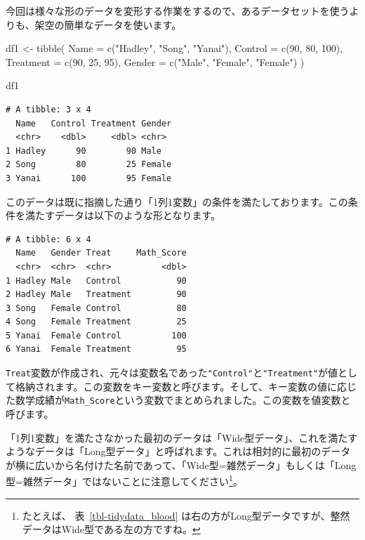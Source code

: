 \documentclass[
  a4paper,
  pandoc,
  ja=standard,
  jafont=haranoaji]{bxjsbook}
\newenvironment{Shaded}{\begin{snugshade}}{\end{snugshade}}
\newcommand{\AttributeTok}[1]{\textcolor[rgb]{0.00,0.48,0.65}{#1}}
\newcommand{\DecValTok}[1]{\textcolor[rgb]{0.68,0.00,0.00}{#1}}
\newcommand{\FunctionTok}[1]{\textcolor[rgb]{0.28,0.35,0.67}{#1}}
\newcommand{\NormalTok}[1]{\textcolor[rgb]{0.00,0.48,0.65}{#1}}
\newcommand{\OtherTok}[1]{\textcolor[rgb]{0.00,0.48,0.65}{#1}}
\newcommand{\StringTok}[1]{\textcolor[rgb]{0.13,0.47,0.30}{#1}}
\begin{document}
今回は様々な形のデータを変形する作業をするので、あるデータセットを使うよりも、架空の簡単なデータを使います。

\begin{Shaded}
\begin{Highlighting}[numbers=left,,]
\NormalTok{df1 }\OtherTok{\textless{}{-}} \FunctionTok{tibble}\NormalTok{(}
  \AttributeTok{Name      =} \FunctionTok{c}\NormalTok{(}\StringTok{"Hadley"}\NormalTok{, }\StringTok{"Song"}\NormalTok{, }\StringTok{"Yanai"}\NormalTok{),}
  \AttributeTok{Control   =} \FunctionTok{c}\NormalTok{(}\DecValTok{90}\NormalTok{, }\DecValTok{80}\NormalTok{, }\DecValTok{100}\NormalTok{),}
  \AttributeTok{Treatment =} \FunctionTok{c}\NormalTok{(}\DecValTok{90}\NormalTok{, }\DecValTok{25}\NormalTok{, }\DecValTok{95}\NormalTok{),}
  \AttributeTok{Gender    =} \FunctionTok{c}\NormalTok{(}\StringTok{"Male"}\NormalTok{, }\StringTok{"Female"}\NormalTok{, }\StringTok{"Female"}\NormalTok{)}
\NormalTok{)}

\NormalTok{df1}
\end{Highlighting}
\end{Shaded}

\begin{verbatim}
# A tibble: 3 x 4
  Name   Control Treatment Gender
  <chr>    <dbl>     <dbl> <chr> 
1 Hadley      90        90 Male  
2 Song        80        25 Female
3 Yanai      100        95 Female
\end{verbatim}

このデータは既に指摘した通り「1列1変数」の条件を満たしております。この条件を満たすデータは以下のような形となります。

\begin{verbatim}
# A tibble: 6 x 4
  Name   Gender Treat     Math_Score
  <chr>  <chr>  <chr>          <dbl>
1 Hadley Male   Control           90
2 Hadley Male   Treatment         90
3 Song   Female Control           80
4 Song   Female Treatment         25
5 Yanai  Female Control          100
6 Yanai  Female Treatment         95
\end{verbatim}

\texttt{Treat}変数が作成され、元々は変数名であった\texttt{"Control"}と\texttt{"Treatment"}が値として格納されます。この変数をキー変数と呼びます。そして、キー変数の値に応じた数学成績が\texttt{Math\_Score}という変数でまとめられました。この変数を値変数と呼びます。

「1列1変数」を満たさなかった最初のデータは「Wide型データ」、これを満たすようなデータは「Long型データ」と呼ばれます。これは相対的に最初のデータが横に広いから名付けた名前であって、「Wide型=雑然データ」もしくは「Long型=雑然データ」ではないことに注意してください\footnote{たとえば、
  表~\ref{tbl-tidydata_blood}
  は右の方がLong型データですが、整然データはWide型である左の方ですね。}。
\end{document}
